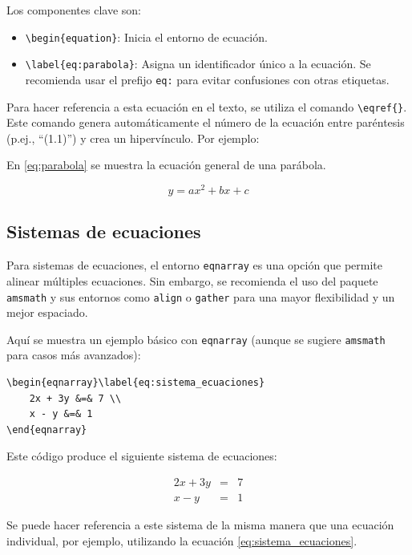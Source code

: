 \documentclass[11pt,a4paper]{book}
\begin{document}
Los componentes clave son:
\begin{itemize}
    \item \verb|\begin{equation}|: Inicia el entorno de ecuación.
    \item \verb|\label{eq:parabola}|: Asigna un identificador único a la ecuación. Se recomienda usar el prefijo \texttt{eq:} para evitar confusiones con otras etiquetas.
\end{itemize}

Para hacer referencia a esta ecuación en el texto, se utiliza el comando \verb|\eqref{}|. Este comando genera automáticamente el número de la ecuación entre paréntesis (p.ej., ``(1.1)'') y crea un hipervínculo. Por ejemplo:

En \eqref{eq:parabola} se muestra la ecuación general de una parábola.

\begin{equation}\label{eq:parabola}
    y = ax^2 + bx + c
\end{equation}

\subsection{Sistemas de ecuaciones}
Para sistemas de ecuaciones, el entorno \texttt{eqnarray} es una opción que permite alinear múltiples ecuaciones. Sin embargo, se recomienda el uso del paquete \texttt{amsmath} y sus entornos como \texttt{align} o \texttt{gather} para una mayor flexibilidad y un mejor espaciado.

Aquí se muestra un ejemplo básico con \texttt{eqnarray} (aunque se sugiere \texttt{amsmath} para casos más avanzados):

\begin{verbatim}
\begin{eqnarray}\label{eq:sistema_ecuaciones}
    2x + 3y &=& 7 \\
    x - y &=& 1
\end{eqnarray}
\end{verbatim}

Este código produce el siguiente sistema de ecuaciones:

\begin{eqnarray}\label{eq:sistema_ecuaciones}
    2x + 3y &=& 7 \\
    x - y &=& 1
\end{eqnarray}

Se puede hacer referencia a este sistema de la misma manera que una ecuación individual, por ejemplo, utilizando la ecuación \eqref{eq:sistema_ecuaciones}.
\end{document}
